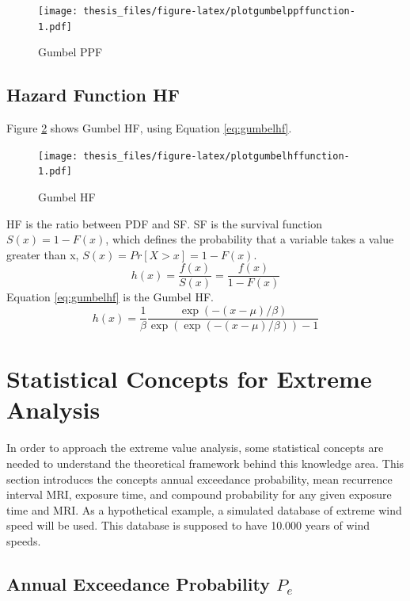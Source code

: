 \documentclass[12pt,oneside]{reedthesis}
\begin{document}
\footnotesize
\begin{figure}
\centering
\texttt{[image: thesis\_files/figure-latex/plotgumbelppffunction-1.pdf]}
\caption{\label{fig:plotgumbelppffunction}Gumbel PPF}
\end{figure}
\normalsize

\hypertarget{hf}{%
\subsection{Hazard Function HF}\label{hf}}

Figure \ref{fig:plotgumbelhffunction} shows Gumbel HF, using Equation \eqref{eq:gumbelhf}.

\footnotesize
\begin{figure}
\centering
\texttt{[image: thesis\_files/figure-latex/plotgumbelhffunction-1.pdf]}
\caption{\label{fig:plotgumbelhffunction}Gumbel HF}
\end{figure}
\normalsize

HF is the ratio between PDF and SF. SF is the survival function \(S(x) = 1 - F(x)\), which defines the probability that a variable takes a value greater than x, \(S(x) = Pr[X > x] = 1 - F(x)\).
\begin{equation}
        h(x) = \frac{f(x)}{S(x)} = \frac{f(x)}{1-F(x)}
  \label{eq:hf}
\end{equation}
Equation \eqref{eq:gumbelhf} is the Gumbel HF.
\begin{equation}
        h(x)= \frac{1}{\beta}\frac{\exp(-(x-\mu)/\beta)}{\exp(\exp(-(x-\mu)/\beta))-1}
  \label{eq:gumbelhf}
\end{equation}
\hypertarget{statistical-concepts-for-extreme-analysis}{%
\section{Statistical Concepts for Extreme Analysis}\label{statistical-concepts-for-extreme-analysis}}

In order to approach the extreme value analysis, some statistical concepts are needed to understand the theoretical framework behind this knowledge area. This section introduces the concepts annual exceedance probability, mean recurrence interval MRI, exposure time, and compound probability for any given exposure time and MRI. As a hypothetical example, a simulated database of extreme wind speed will be used. This database is supposed to have 10.000 years of wind speeds.

\hypertarget{annual-exceedance-probability-p_e}{%
\subsection{\texorpdfstring{Annual Exceedance Probability \(P_e\)}{Annual Exceedance Probability P\_e}}\label{annual-exceedance-probability-p_e}}
\end{document}
